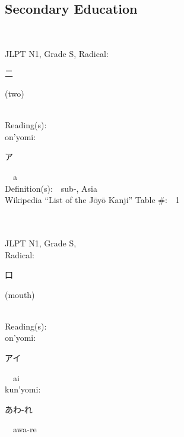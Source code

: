 \subsection*{Secondary Education }
  \label{P1-S}
\begin{multicols}{2}
{\fontsize{34pt}{40pt}  }\ \ \\  %
{JLPT N1, Grade S, Radical:\ \ {\begin{CJK}{UTF8}{min} 二 \end{CJK}} (two) } \\
Reading(s):\ \ \\
{\hspace*{1em}}on'yomi:\ \ \\
{\hspace*{2em}}{\begin{CJK}{UTF8}{min} ア \end{CJK}}\ \ a\ \ \\
Definition(s):\ \ sub-, Asia \\
Wikipedia ``List of the J\=oy\=o Kanji'' Table \#:\ \      1 \\
\ \ \\
{\fontsize{34pt}{40pt}  }\ \ \\
{JLPT N1, Grade S, \\Radical:\ \ {\begin{CJK}{UTF8}{min} 口 \end{CJK}} (mouth) } \\
Reading(s):\ \ \\
{\hspace*{1em}}on'yomi:\ \ \\
{\hspace*{2em}}{\begin{CJK}{UTF8}{min} アイ \end{CJK}}\ \ ai\ \ \\
{\hspace*{1em}}kun'yomi:\ \ \\
{\hspace*{2em}}{\begin{CJK}{UTF8}{min} あわ-れ \end{CJK}}\ \ awa-re\ \ \\

\end{multicols}
